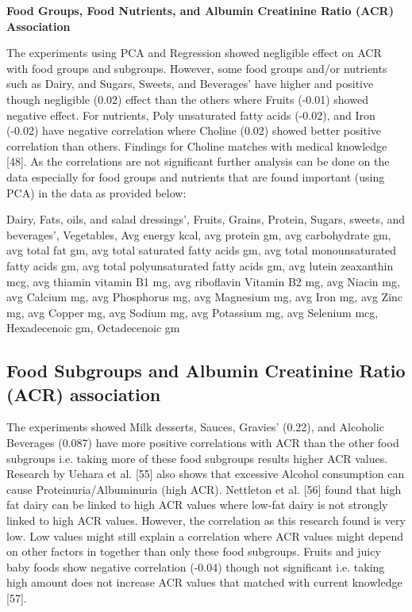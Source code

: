 \medskip
\noindent \textbf{Food Groups, Food Nutrients, and Albumin Creatinine Ratio (ACR) Association}

\noindent The experiments using PCA and Regression showed negligible effect on ACR with food groups and subgroups. However, some food groups and/or nutrients such as Dairy, and  Sugars, Sweets, and Beverages’  have higher and positive though negligible (0.02) effect than the others where Fruits (-0.01) showed negative effect.  For nutrients, Poly unsaturated fatty acids (-0.02), and Iron (-0.02) have negative correlation where Choline (0.02) showed better positive correlation than others. Findings for Choline matches with medical knowledge [48]. As the correlations are not significant further analysis can be done on the data especially for food groups and nutrients that are found important (using PCA) in the data as provided below:

\noindent Dairy,  Fats, oils, and salad dressings’,  Fruits,  Grains,  Protein,   Sugars, sweets, and beverages’, Vegetables, Avg energy kcal,  avg protein gm,  avg carbohydrate gm,  avg total fat gm,  avg total saturated fatty acids gm, avg total monounsaturated fatty acids gm,  avg total polyunsaturated fatty acids gm, avg lutein zeaxanthin mcg,  avg thiamin vitamin B1 mg,  avg riboflavin Vitamin B2 mg,  avg Niacin mg, avg Calcium mg,  avg Phosphorus mg,  avg Magnesium mg,  avg Iron mg, avg Zinc mg,  avg Copper mg,  avg Sodium mg,  avg Potassium mg,  avg Selenium mcg,  Hexadecenoic gm,  Octadecenoic gm

\subsection{Food Subgroups and Albumin Creatinine Ratio (ACR) association}

\noindent The experiments showed  Milk desserts, Sauces, Gravies’ (0.22), and Alcoholic Beverages (0.087) have more positive correlations with ACR than the other food subgroups  i.e. taking more of these food subgroups results higher ACR values. Research by Uehara et al. [55] also shows that excessive Alcohol consumption can cause Proteinuria/Albuminuria (high ACR). Nettleton et al. [56] found that high fat dairy can be linked to high ACR values where low-fat dairy is not strongly linked to high ACR values. However, the correlation as this research found is very low. Low values might still explain a correlation where ACR values might depend on other factors in together than only these food subgroups. Fruits and juicy baby foods show negative correlation (-0.04) though not significant i.e. taking high amount does not increase ACR values that matched with current knowledge [57].

